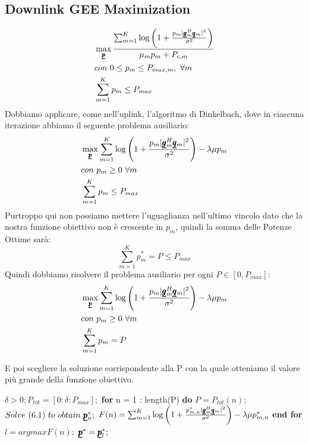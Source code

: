 \subsection{Downlink GEE Maximization}
\begin{equation*}
    \begin{aligned}
    &\max_{\pmb{\underline{p}}} \frac{\sum_{m=1}^K \log\left(1 + \frac{p_m |\pmb{\underline{g}}_m^H \pmb{\underline{q}}_m |^2}{\sigma^2 } \right)}{\mu_m p_m + P_{c,m}} \\
    &con \ 0 \leq p_m \leq P_{max,m}, \ \forall m \\
     &\sum_{m=1}^K p_m \leq P_{max}
    \end{aligned}
\end{equation*}
Dobbiamo applicare, come nell'uplink, l'algoritmo di Dinkelbach, dove in ciascuna iterazione abbiamo il seguente problema ausiliario:
\begin{equation*}
    \begin{aligned}
    &\max_{\pmb{\underline{p}}} \sum_{m=1}^K  \log\left(1 + \frac{p_m |\pmb{\underline{g}}_m^H \pmb{\underline{q}}_m |^2}{\sigma^2 } \right) - \lambda \mu p_m \\
    &con \ p_m \geq 0 \ \forall m \\
    &\sum_{m=1}^K p_m \leq P_{max}
    \end{aligned}
\end{equation*}
Purtroppo qui non possiamo mettere l'uguaglianza nell'ultimo vincolo dato che la nostra funzione obiettivo non è crescente in $p_m$, quindi la somma delle Potenze Ottime sarà:
\begin{equation*}
    \sum_{m=1}^K p_m^* = P \leq P_{max}
\end{equation*}
Quindi dobbiamo risolvere il problema ausiliario per ogni $P \in [0, P_{max}]$:
\begin{equation}
    \begin{aligned}
     &\max_{\pmb{\underline{p}}} \sum_{m=1}^K  \log\left(1 + \frac{p_m |\pmb{\underline{g}}_m^H \pmb{\underline{q}}_m |^2}{\sigma^2 } \right) - \lambda \mu p_m \\
    &con \ p_m \geq 0 \ \forall m \\
    &\sum_{m=1}^K p_m = P
    \end{aligned}
\end{equation}
\begin{center}
    E poi scegliere la soluzione corrispondente alla P con la quale otteniamo il valore più grande della funzione obiettivo.
\end{center}
\begin{algorithm}
\begin{algorithmic}
\Large
{} $\delta > 0; P_{tot} = [0 : \delta : P_{max}];$
\State \textbf{for} n = 1 : length(P) \textbf{do}
\State $P = P_{tot}(n);$
\State $Solve \ (6.1) \ to \ obtain  \ \vc{p}_n^*;$
\State $F(n) = \sum_{m = 1}^K \log\left(1 + \frac{p_{m,n}^* |\pmb{\underline{g}}_m^H \pmb{\underline{q}}_m |^2}{\sigma^2 } \right) - \lambda \mu p_{m,n}^*$
\State \textbf{end for}
\State $l = argmax F(n);$
\State $\pmb{\underline{p}}^* = \pmb{\underline{p}}_l^*;$
\end{algorithmic}
\end{algorithm}
